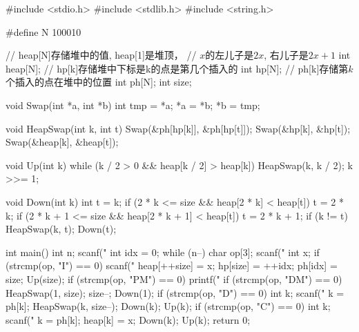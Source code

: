 \begin{mycpptwocol}[可修改任意元素的堆]
    #include <stdio.h>
    #include <stdlib.h>
    #include <string.h>

    #define N 100010

    // heap[N]存储堆中的值, heap[1]是堆顶，
    // $x$的左儿子是$2x$, 右儿子是$2x + 1$
    int heap[N];
    // hp[k]存储堆中下标是k的点是第几个插入的
    int hp[N];
    // ph[k]存储第$k$个插入的点在堆中的位置
    int ph[N];
    int size;

    void Swap(int *a, int *b) {
        int tmp = *a;
        *a = *b;
        *b = tmp;
    }

    void HeapSwap(int k, int t) {
        Swap(&ph[hp[k]], &ph[hp[t]]);
        Swap(&hp[k], &hp[t]);
        Swap(&heap[k], &heap[t]);
    }

    void Up(int k) {
        while (k / 2 > 0 &&
        heap[k / 2] > heap[k]) {
            HeapSwap(k, k / 2);
            k >>= 1;
        }
    }

    void Down(int k) {
        int t = k;
        if (2 * k <= size &&
        heap[2 * k] < heap[t]) {
            t = 2 * k;
        }
        if (2 * k + 1 <= size &&
        heap[2 * k + 1] < heap[t]) {
            t = 2 * k + 1;
        }
        if (k != t) {
            HeapSwap(k, t);
            Down(t);
        }
    }

    int main() {
        int n;
        scanf("%
        int idx = 0;
        while (n--) {
            char op[3];
            scanf("%
            int x;
            if (strcmp(op, "I") == 0) {
                scanf("%
                heap[++size] = x;
                hp[size] = ++idx;
                ph[idx] = size;
                Up(size);
            }
            if (strcmp(op, "PM") == 0) {
                printf("%
            }
            if (strcmp(op, "DM") == 0) {
                HeapSwap(1, size);
                size--;
                Down(1);
            }
            if (strcmp(op, "D") == 0) {
                int k;
                scanf("%
                k = ph[k];
                HeapSwap(k, size--);
                Down(k);
                Up(k);
            }
            if (strcmp(op, "C") == 0) {
                int k;
                scanf("%
                k = ph[k];
                heap[k] = x;
                Down(k);
                Up(k);
            }
        }
        return 0;
    }
\end{mycpptwocol}


